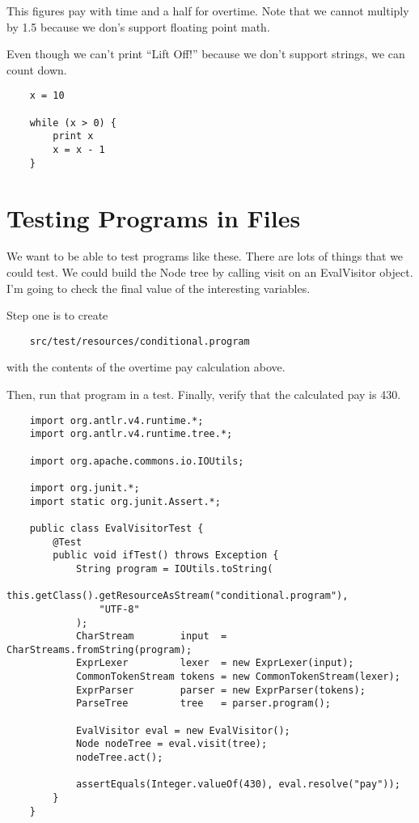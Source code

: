 This figures pay with time and a half for overtime. Note that we
cannot multiply by 1.5 because we don's support floating point math.

Even though we can't print ``Lift Off!'' because we don't support strings,
we can count down.

{\footnotesize
\begin{verbatim}
    x = 10

    while (x > 0) {
        print x
        x = x - 1
    }
\end{verbatim}
}

\section{Testing Programs in Files}

We want to be able to test programs like these. There are lots of things
that we could test. We could build the Node tree by calling visit on
an EvalVisitor object. I'm going to check the final value of the interesting
variables.

Step one is to create

{\footnotesize
\begin{verbatim}
    src/test/resources/conditional.program
\end{verbatim}
}

with the contents of the overtime pay calculation above.

Then, run that program in a test. Finally, verify that the calculated
pay is 430.

{\footnotesize
\begin{verbatim}
    import org.antlr.v4.runtime.*;
    import org.antlr.v4.runtime.tree.*;
    
    import org.apache.commons.io.IOUtils;
    
    import org.junit.*;
    import static org.junit.Assert.*;
    
    public class EvalVisitorTest {
        @Test
        public void ifTest() throws Exception {
            String program = IOUtils.toString(
                this.getClass().getResourceAsStream("conditional.program"),
                "UTF-8"
            );
            CharStream        input  = CharStreams.fromString(program);
            ExprLexer         lexer  = new ExprLexer(input);
            CommonTokenStream tokens = new CommonTokenStream(lexer);
            ExprParser        parser = new ExprParser(tokens);
            ParseTree         tree   = parser.program();
    
            EvalVisitor eval = new EvalVisitor();
            Node nodeTree = eval.visit(tree);
            nodeTree.act();
    
            assertEquals(Integer.valueOf(430), eval.resolve("pay"));
        }
    }
\end{verbatim}
}

